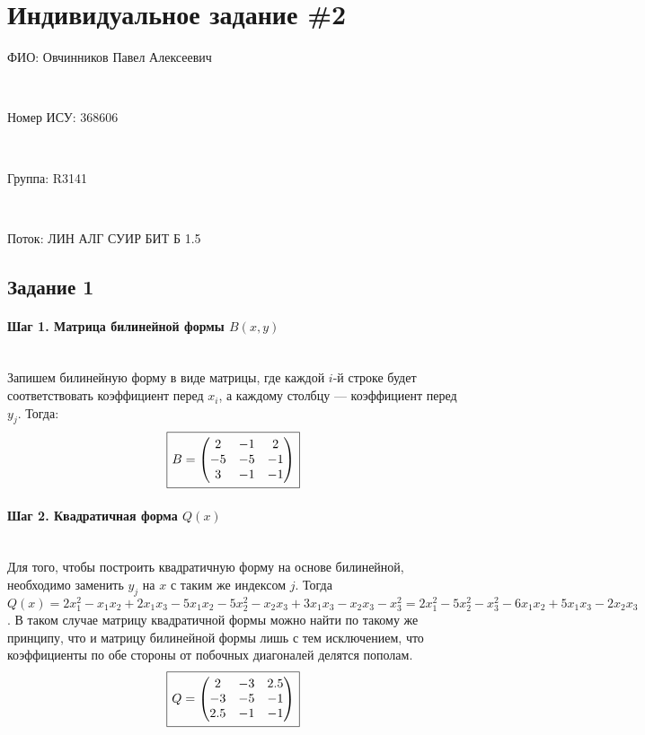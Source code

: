 \documentclass{article}
\newcommand*\squared[1]{\tikz[baseline=(char.base)]{
            \node[shape=rectangle,draw,inner sep=4pt] (char) {#1};}}
\begin{document}
\section*{Индивидуальное задание \#2}
\begin{multicols}{2}
\noindent\begin{large}ФИО: Овчинников Павел Алексеевич\end{large} \\
\begin{large}Номер ИСУ: 368606\end{large} \\
\begin{large}Группа: R3141\end{large} \\
\begin{large}Поток: ЛИН АЛГ СУИР БИТ Б 1.5\end{large}
\end{multicols}

\subsection*{Задание 1}
\paragraph*{Шаг 1. Матрица билинейной формы $B(x, y)$} \, \\
Запишем билинейную форму в виде матрицы, где каждой $i$-й строке будет соответствовать коэффициент перед $x_i$, а каждому столбцу --- коэффициент перед $y_j$. Тогда:
$$\squared{$B = \begin{pmatrix}
2 & -1 & 2 \\
-5 & -5 & -1 \\
3 & -1 & -1
\end{pmatrix}$}$$
\paragraph*{Шаг 2. Квадратичная форма $Q(x)$} \, \\
Для того, чтобы построить квадратичную форму на основе билинейной, необходимо заменить $y_j$ на $x$ с таким же индексом $j$. Тогда $Q(x) = 2x^2_1 - x_1x_2 + 2x_1x_3 - 5x_1x_2 - 5x^2_2 - x_2x_3 + 3x_1x_3 - x_2x_3 - x^2_3 = 2x_1^2 - 5x_2^2 - x_3^2 - 6x_1x_2 + 5x_1x_3 - 2x_2x_3$. В таком случае матрицу квадратичной формы можно найти по такому же принципу, что и матрицу билинейной формы лишь с тем исключением, что коэффициенты по обе стороны от побочных диагоналей делятся пополам.
$$\squared{$Q = \begin{pmatrix}
2 & -3 & 2.5 \\
-3 & -5 & -1 \\
2.5 & -1 & -1
\end{pmatrix}$}$$
\end{document}
